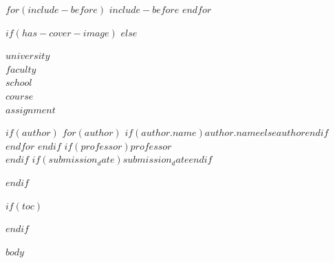 \documentclass[$if(fontsize)$$fontsize$$else$12pt$endif$,$if(lang)$$lang$$else$spanish$endif$]{$if(documentclass)$$documentclass$$else$article$endif$}
\renewcommand{\contentsname}{Índice}
\renewcommand{\listtablename}{Índice de Tablas}
\renewcommand{\listfigurename}{Índice de Figuras}
\begin{document}
$for(include-before)$
$include-before$
$endfor$

$if(has-cover-image)$
$else$
\begin{center}
    {\bfseries \Large $university$}\\[0.3cm]
    {\bfseries \large $faculty$}\\[0.2cm]
    {\bfseries $school$}\\[1.5cm]
    
    {\bfseries \large $course$}\\[1cm]
    
    {\bfseries \Large $assignment$}\\[1.5cm]
\end{center}

\begin{center}
    $if(author)$
        $for(author)$
            $if(author.name)$$author.name$$else$$author$$endif$ \\
        $endfor$
    $endif$
    \vspace{0.5cm}
    $if(professor)$$professor$ \\ $endif$
    $if(submission_date)$$submission_date$$endif$
\end{center}

\vspace{1cm}
$endif$

\onehalfspacing
\setlength{\parindent}{1.27cm}

$if(toc)$
\renewcommand{\contentsname}{ÍNDICE DE CONTENIDOS}
\hypersetup{linkcolor=black}
\tableofcontents
\newpage

\renewcommand{\listtablename}{ÍNDICE DE TABLAS}
\listoftables
\newpage

\renewcommand{\listfigurename}{ÍNDICE DE FIGURAS}
\listoffigures
\newpage
\hypersetup{linkcolor=WordBlue}
$endif$

\fontsize{12pt}{18pt}\selectfont

$body$
\end{document}
